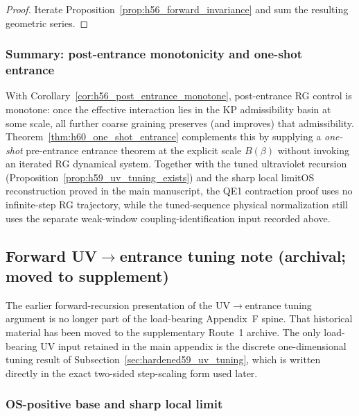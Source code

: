 \begin{proof}
Iterate Proposition~\ref{prop:h56_forward_invariance} and sum the resulting geometric series.
\end{proof}

\subsubsection{Summary: post-entrance monotonicity and one-shot entrance}
With Corollary~\ref{cor:h56_post_entrance_monotone}, post-entrance RG control is monotone: once the effective interaction
lies in the KP admissibility basin at some scale, all further coarse graining preserves (and improves) that admissibility.
Theorem~\ref{thm:h60_one_shot_entrance} complements this by supplying a \emph{one-shot} pre-entrance entrance theorem at the explicit scale $B(\beta)$
without invoking an iterated RG dynamical system.
Together with the tuned ultraviolet recursion (Proposition~\ref{prop:h59_uv_tuning_exists}) and the sharp local limit\/OS reconstruction proved in the main manuscript,
the QE1 contraction proof uses no infinite-step RG trajectory, while the tuned-sequence physical normalization still uses the separate weak-window coupling-identification input recorded above.


\subsection{Forward UV$\to$entrance tuning note (archival; moved to supplement)}
\label{sec:hardened57}

The earlier forward-recursion presentation of the UV$\to$entrance tuning argument is no longer part of the load-bearing Appendix~F spine.
That historical material has been moved to the supplementary Route~1 archive.
The only load-bearing UV input retained in the main appendix is the discrete one-dimensional tuning result of Subsection~\ref{sec:hardened59_uv_tuning}, which is written directly in the exact two-sided step-scaling form used later.

\subsubsection{OS-positive base and sharp local limit}
\label{subsec:h57_local_algebra_limit}

